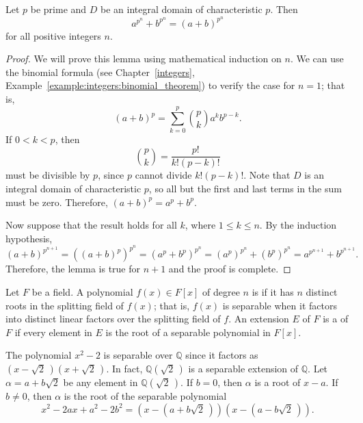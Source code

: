 \begin{lemma}\label{finite:freshmans_dream}
Let $p$ be prime and $D$ be an integral domain of characteristic $p$.  Then
\[
a^{p^n} + b^{p^n} = (a + b)^{p^n}
\]
for all positive integers $n$.  
\end{lemma}

\begin{proof}
We will prove this lemma using mathematical induction on $n$.  We can use the binomial formula (see Chapter~\ref{integers}, Example~\ref{example:integers:binomial_theorem}) to verify the case for $n = 1$; that is,
\[
(a+b)^p 
= 
\sum_{k=0}^{p} 
\binom{p}{k}
a^k b^{p-k}.
\]
If $0 < k < p$, then
\[
\binom{p}{k}
=
\frac{p!}{k!(p-k)!}
\]
must be divisible by $p$, since $p$ cannot divide $k!(p - k)!$.  Note that $D$ is an integral domain of characteristic $p$, so all but the first and last terms in the sum must be zero.  Therefore, $(a + b)^p =
a^p + b^p$.  

Now suppose that the result holds for all $k$, where $1 \leq k \leq n$.  By the induction hypothesis,
\[
(a + b)^{p^{n + 1}}
=
((a + b)^p)^{p^{n}}
=
(a^p + b^p)^{p^{n}}
=
(a^p)^{p^{n}} + (b^p)^{p^{n}}
=
a^{p^{n + 1}} + b^{p^{n + 1}}.
\]
Therefore, the lemma is true for $n + 1$ and the proof is complete.
\end{proof}

\medskip

Let $F$ be a field.  A polynomial $f(x) \in F[x]$ of degree $n$ is  if it has $n$ distinct roots in the splitting field of $f(x)$; that is, $f(x)$ is separable when it factors into distinct linear factors over the splitting field of $f$.  An extension $E$ of $F$ is a  of $F$ if every element in $E$ is the root of a separable polynomial in $F[x]$.   


\begin{example}{}
The polynomial $x^2 - 2$ is separable over ${\mathbb Q}$ since it factors as $(x - \sqrt{2}\, )(x + \sqrt{2}\, )$. In fact, ${\mathbb Q}(\sqrt{2}\, )$ is a separable extension of ${\mathbb Q}$.  Let $\alpha =  a + b \sqrt{2}$ be any element in ${\mathbb Q}(\sqrt{2}\, )$. If $b = 0$, then $\alpha$ is a root of $x - a$.  If $b \neq 0$, then $\alpha$ is the root  of the separable polynomial 
\[
x^2 - 2 a x + a^2 - 2 b^2 = (x - (a + b \sqrt{2}\, ))(x - (a - b \sqrt{2}\, )).
\]
\end{example}
 
